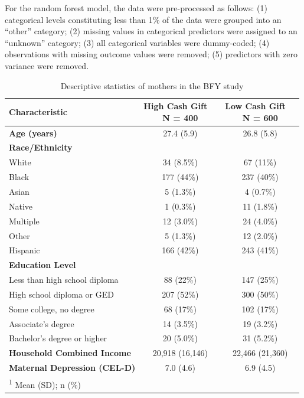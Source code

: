 \documentclass[sn-basic,pdflatex]{sn-jnl}
\begin{document}
For the random forest model, the data were pre-processed as follows: (1)
categorical levels constituting less than 1\% of the data were grouped
into an ``other'' category; (2) missing values in categorical predictors
were assigned to an ``unknown'' category; (3) all categorical variables
were dummy-coded; (4) observations with missing outcome values were
removed; (5) predictors with zero variance were removed.

\begin{table}
\centering
\caption{\label{tab:table_2}Descriptive statistics of mothers in the BFY study}
\centering
\fontsize{10}{12}\selectfont
\begin{tabular}[t]{lcc}
\toprule
\textbf{Characteristic} & \makecell[c]{\textbf{High Cash Gift}\ \ \\N = 400} & \makecell[c]{\textbf{Low Cash Gift}\ \ \\N = 600}\\
\midrule
\textbf{Age (years)} & 27.4 (5.9) & 26.8 (5.8)\\
\textbf{Race/Ethnicity} &  & \\
\hspace{1em}White & 34 (8.5\%) & 67 (11\%)\\
\hspace{1em}Black & 177 (44\%) & 237 (40\%)\\
\hspace{1em}Asian & 5 (1.3\%) & 4 (0.7\%)\\
\hspace{1em}Native & 1 (0.3\%) & 11 (1.8\%)\\
\hspace{1em}Multiple & 12 (3.0\%) & 24 (4.0\%)\\
\hspace{1em}Other & 5 (1.3\%) & 12 (2.0\%)\\
\hspace{1em}Hispanic & 166 (42\%) & 243 (41\%)\\
\textbf{Education Level} &  & \\
\hspace{1em}Less than high school diploma & 88 (22\%) & 147 (25\%)\\
\hspace{1em}High school diploma or GED & 207 (52\%) & 300 (50\%)\\
\hspace{1em}Some college, no degree & 68 (17\%) & 102 (17\%)\\
\hspace{1em}Associate's degree & 14 (3.5\%) & 19 (3.2\%)\\
\hspace{1em}Bachelor's degree or higher & 20 (5.0\%) & 31 (5.2\%)\\
\textbf{Household Combined Income} & 20,918 (16,146) & 22,466 (21,360)\\
\textbf{Maternal Depression (CEL-D)} & 7.0 (4.6) & 6.9 (4.5)\\
\bottomrule
\multicolumn{3}{l}{\rule{0pt}{1em}\textsuperscript{1} Mean (SD); n (\%)}\\
\end{tabular}
\end{table}
\end{document}
